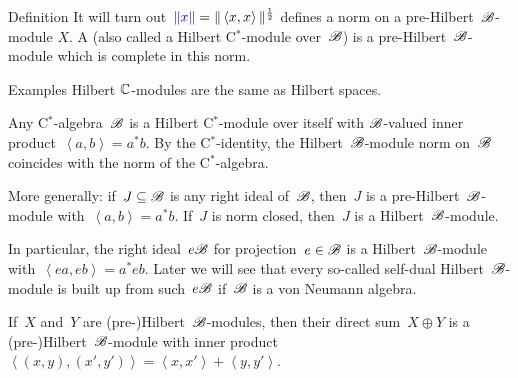 \documentclass[b]{subfiles}
\begin{document}
\begin{parsec}
\begin{point}{Definition}
It will turn out~$\Define{\| x \|} = \| \left<x,x\right> \|^{\frac{1}{2}}$
        defines a norm on a pre-Hilbert~$\mathscr{B}$-module $X$.
A 
    (also called a Hilbert C$^*$-module over~$\mathscr{B}$)
    is a pre-Hilbert~$\mathscr{B}$-module
    which is complete in this norm.
\end{point}
\begin{point}{Examples}%
Hilbert $\mathbb{C}$-modules are the same as Hilbert spaces.

Any C$^*$-algebra~$\mathscr{B}$ is a Hilbert C$^*$-module over itself
    with $\mathscr{B}$-valued inner product~$\left<a,b\right> = a^*b$.
By the C$^*$-identity, the Hilbert~$\mathscr{B}$-module
    norm on~$\mathscr{B}$ coincides with
    the norm of the C$^*$-algebra.

More generally: if~$J \subseteq \mathscr{B}$
    is any right ideal of~$\mathscr{B}$,
    then~$J$ is a pre-Hilbert~$\mathscr{B}$-module
    with~$\left<a,b\right> = a^*b$.
If~$J$ is norm closed, then~$J$ is a Hilbert~$\mathscr{B}$-module.

In particular, the right ideal~$e \mathscr{B}$ for projection~$e \in \mathscr{B}$
    is a Hilbert~$\mathscr{B}$-module with~$\left<ea,eb\right> = a^*eb$.
Later we will see that every so-called self-dual
    Hilbert~$\mathscr{B}$-module is built up from such~$e \mathscr{B}$
    if~$\mathscr{B}$ is a von Neumann algebra.
    
If~$X$ and~$Y$ are (pre-)Hilbert~$\mathscr{B}$-modules,
    then their direct sum~$X \oplus Y$
    is a (pre-)Hilbert~$\mathscr{B}$-module
    with inner product~$\left<(x,y), (x',y')\right>
                = \left<x,x'\right>+\left<y,y'\right>$.
\end{point}
\end{parsec}
\end{document}
